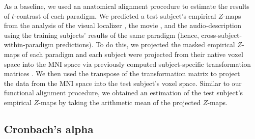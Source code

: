


%
As a baseline, we used an anatomical alignment procedure to estimate the results
of $t$-contrast of each paradigm.
%
We predicted a test subject's empirical $Z$-maps from the analysis of
%
the visual localizer \citep{sengupta2016extension},
%
the movie \citep{haeusler2022processing}, and
%
the audio-description \citep{haeusler2022processing}
%
using the training subjects' results of the same paradigm (hence,
cross-subject-within-paradigm predictions).
%
To do this, we projected the masked empirical $Z$-maps of each paradigm and each
subject were projected from their native voxel space into the MNI space via
previously computed subject-specific transformation matrices
\citep[][\href{https://github.com/psychoinformatics-de/studyforrest-data-templatetransforms}{\url{github.com/psychoinformatics-de/studyforrest-data-templatetransforms}}]{hanke2014audiomovie}.
We then used the transpose of the transformation matrix to project the data from
the MNI space into the test subject's voxel space.
Similar to our functional alignment procedure, we obtained an estimation of the
test subject's empirical $Z$-maps by taking the arithmetic mean of the projected
$Z$-maps.



\subsection{Cronbach's alpha}





